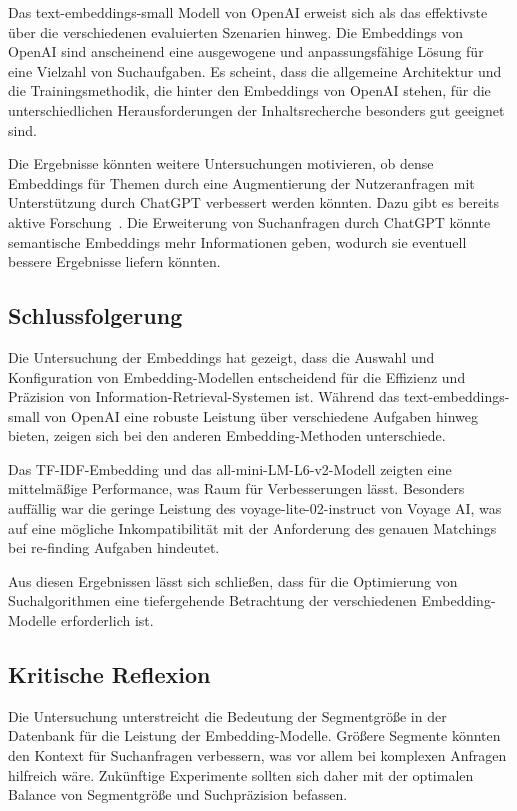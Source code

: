 Das text-embeddings-small Modell von OpenAI erweist sich als das effektivste über die verschiedenen evaluierten Szenarien hinweg. 
Die Embeddings von OpenAI sind anscheinend eine ausgewogene und anpassungsfähige Lösung für eine Vielzahl von Suchaufgaben. 
Es scheint, dass die allgemeine Architektur und die Trainingsmethodik, die hinter den Embeddings von OpenAI stehen, für die unterschiedlichen Herausforderungen der Inhaltsrecherche besonders gut geeignet sind.

Die Ergebnisse könnten weitere Untersuchungen motivieren, ob dense Embeddings für Themen durch eine Augmentierung der Nutzeranfragen mit Unterstützung durch ChatGPT verbessert werden könnten. Dazu gibt es bereits aktive Forschung~\cite{shum2024}\cite{dai2023}. 
Die Erweiterung von Suchanfragen durch ChatGPT könnte semantische Embeddings mehr Informationen geben, wodurch sie eventuell bessere Ergebnisse liefern könnten.


\subsection{Schlussfolgerung}

Die Untersuchung der Embeddings hat gezeigt, dass die Auswahl und Konfiguration von Embedding-Modellen entscheidend für die Effizienz und Präzision von Information-Retrieval-Systemen ist. 
Während das text-embeddings-small von OpenAI eine robuste Leistung über verschiedene Aufgaben hinweg bieten, zeigen sich bei den anderen Embedding-Methoden unterschiede.

Das TF-IDF-Embedding und das all-mini-LM-L6-v2-Modell zeigten eine mittelmäßige Performance, was Raum für Verbesserungen lässt. 
Besonders auffällig war die geringe Leistung des voyage-lite-02-instruct von Voyage AI, was auf eine mögliche Inkompatibilität mit der Anforderung des genauen Matchings bei re-finding Aufgaben hindeutet.

Aus diesen Ergebnissen lässt sich schließen, dass für die Optimierung von Suchalgorithmen eine tiefergehende Betrachtung der verschiedenen Embedding-Modelle erforderlich ist.

\subsection{Kritische Reflexion}

Die Untersuchung unterstreicht die Bedeutung der Segmentgröße in der Datenbank für die Leistung der Embedding-Modelle. 
Größere Segmente könnten den Kontext für Suchanfragen verbessern, was vor allem bei komplexen Anfragen hilfreich wäre. 
Zukünftige Experimente sollten sich daher mit der optimalen Balance von Segmentgröße und Suchpräzision befassen.

